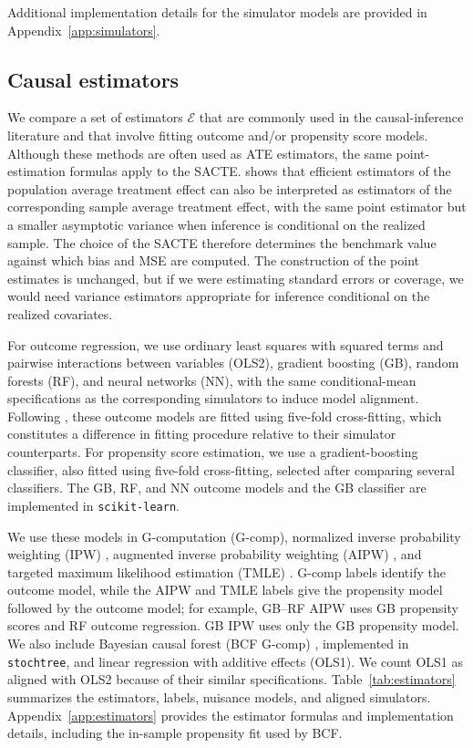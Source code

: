 Additional implementation details for the simulator models are provided in Appendix~\ref{app:simulators}.

\subsection{Causal estimators}

We compare a set of estimators \(\mathcal E\) that are commonly used in the causal-inference literature and that involve fitting outcome and/or propensity score models. Although these methods are often used as ATE estimators, the same point-estimation formulas apply to the SACTE.  shows that efficient estimators of the population average treatment effect can also be interpreted as estimators of the corresponding sample average treatment effect, with the same point estimator but a smaller asymptotic variance when inference is conditional on the realized sample. The choice of the SACTE therefore determines the benchmark value against which bias and MSE are computed. The construction of the point estimates is unchanged, but if we were estimating standard errors or coverage, we would need variance estimators appropriate for inference conditional on the realized covariates.

For outcome regression, we use ordinary least squares with squared terms and pairwise interactions between variables (OLS2), gradient boosting (GB), random forests (RF), and neural networks (NN), with the same conditional-mean specifications as the corresponding simulators to induce model alignment. Following , these outcome models are fitted using five-fold cross-fitting, which constitutes a difference in fitting procedure relative to their simulator counterparts. For propensity score estimation, we use a gradient-boosting classifier, also fitted using five-fold cross-fitting, selected after comparing several classifiers. The GB, RF, and NN outcome models and the GB classifier are implemented in \texttt{scikit-learn}.

We use these models in G-computation (G-comp), normalized inverse probability weighting (IPW) \cite{luncefordStratificationWeightingPropensity2004}, augmented inverse probability weighting (AIPW) \cite{bangDoublyRobustEstimation2005}, and targeted maximum likelihood estimation (TMLE) \cite{vanderlaanTargetedMaximumLikelihood2006}. G-comp labels identify the outcome model, while the AIPW and TMLE labels give the propensity model followed by the outcome model; for example, GB--RF AIPW uses GB propensity scores and RF outcome regression. GB IPW uses only the GB propensity model. We also include Bayesian causal forest (BCF G-comp) \cite{hahnBayesianRegressionTree2020}, implemented in \texttt{stochtree}, and linear regression with additive effects (OLS1). We count OLS1 as aligned with OLS2 because of their similar specifications. Table~\ref{tab:estimators} summarizes the estimators, labels, nuisance models, and aligned simulators. Appendix~\ref{app:estimators} provides the estimator formulas and implementation details, including the in-sample propensity fit used by BCF.



